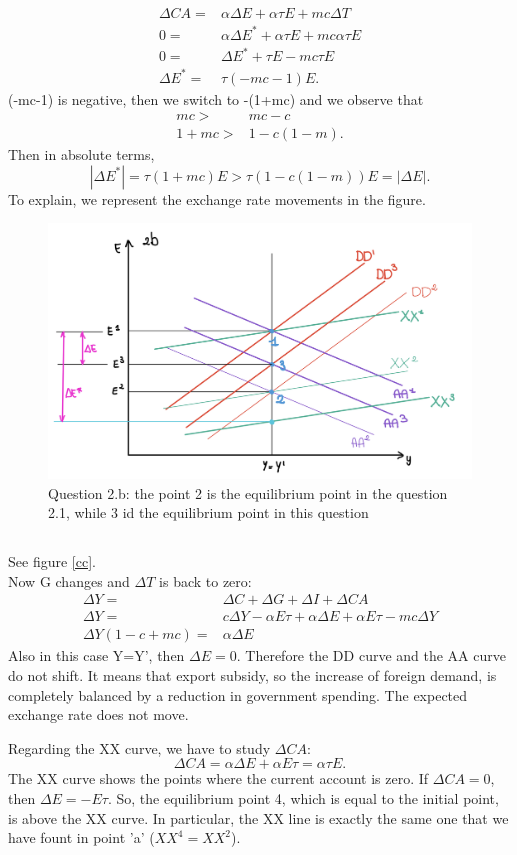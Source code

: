 \documentclass[	11pt, ]{fphw}
\begin{document}
\begin{align}
\Delta CA = & \alpha \Delta E + \alpha \tau E +mc \Delta T \\
0=&\alpha \Delta E ^{*}+ \alpha \tau E +mc \alpha \tau E \\
0=& \Delta E^{*} + \tau E -mc  \tau E \\
\Delta E^{*} =& \tau (-mc-1) E .
\end{align} 
(-mc-1) is negative, then we switch to -(1+mc) and we observe that 
\begin{align}
    mc>&mc-c  \\
    1+mc>&1-c(1-m).
\end{align}
Then in absolute terms,
\[|\Delta E^{*} | = \tau (1+mc) E> \tau (1-c(1-m))E=|\Delta E|.\]
To explain, we represent the exchange rate movements in the figure.
\begin{figure}[h!] 
\centering 
\includegraphics[scale=0.23]{8b.PNG} 
\caption{Question 2.b: the point 2 is the equilibrium point in the question 2.1, while 3 id the equilibrium point in this question} 
\label{bb}
\end{figure}


\subsection{}
See figure \vref{cc}. \\
Now G changes and $\Delta T$ is back to zero:
\begin{align}
    \Delta Y=&\Delta C+\Delta  G+\Delta I+\Delta CA \\
    \Delta Y=&c \Delta Y- \alpha E \tau + \alpha \Delta E + \alpha E \tau -mc\Delta Y  \\
    \Delta Y (1-c+mc)=& \alpha \Delta E
\end{align}
Also in this case Y=Y', then $\Delta E =0$. Therefore the DD curve and the AA curve do not shift. It means that  export subsidy, so the  increase of foreign demand, is completely balanced by a reduction in government spending. The expected exchange rate does not move. \par Regarding the XX curve, we have to study $\Delta CA$:
\[ \Delta CA= \alpha \Delta E + \alpha E \tau = \alpha \tau E.\]
The XX curve shows the points where the current account is zero. If $\Delta CA = 0$, then $\Delta E = -E\tau$.
So, the equilibrium point 4, which is equal to the initial point, is above the XX curve. In particular, the XX line is exactly the same one that we have fount in point 'a' ($XX^{4}=XX^{2}$). 
\end{document}
